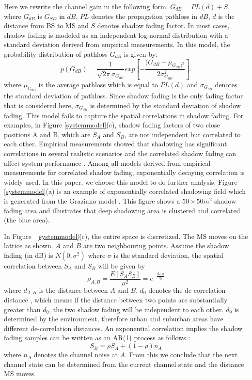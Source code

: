 \par Here we rewrite the channel gain in the following form: $G_{dB}=PL(d)+S$, where $G_{dB}$ is $G_{SD}$ in $dB$, $PL$ denotes the propagation pathloss in $dB$, $d$ is the distance from BS to MS and $S$ denotes shadow fading factor. In most cases, shadow fading is modeled as an independent log-normal distribution \cite{goldsmith2005wireless} with a standard deviation derived from empirical measurements. In this model, the probability distribution of pathloss $G_{dB}$ is given by:
\begin{equation}
p(G_{dB})=\frac{1}{\sqrt{2\pi}\sigma_{G_{dB}}}exp[-\frac{(G_{dB}-\mu_{G_{dB})^2}}{2\sigma_{G_{dB}}^2}].
\end{equation}
where $\mu_{G_{dB}}$ is the average pathloss which is equal to $PL(d)$ and $\sigma_{G_{dB}}$ denotes the standard deviation of pathloss. Since shadow fading is the only fading factor that is considered here, $\sigma_{G_{dB}}$ is determined by the standard deviation of shadow fading.
This model fails to capture the spatial correlations in shadow fading. For examples, in Figure \ref{systemmodel}(c), shadow fading factors of two close positions A and B, which are $S_{A}$ and $S_{B}$, are not independent but correlated to each other. Empirical measurements showed that shadowing has significant correlations in several realistic scenarios and the correlated shadow fading can affect system performance \cite{graziano1978propagation}. Among all models derived from empirical measurements for correlated shadow fading, exponentially decaying correlation \cite{gudmundson1991correlation} is widely used. In this paper, we choose this model to do further analysis. Figure \ref{systemmodel}(a) is an example of exponentially correlated shadowing field which is generated from the Graziano model \cite{graziano1978propagation}. This figure shows a $50\times50 m^{2}$ shadow fading area and illustrates that deep shadowing area is clustered and correlated (the blue area).
\par In Figure ~\ref{systemmodel}(c), the entire space is discretized. The MS moves on the lattice as shown. $A$ and $B$ are two neighbouring points. Assume the shadow fading (in dB) is $N(0,\sigma^{2})$ where $\sigma$ is the standard deviation, the spatial correlation between $S_{A}$ and $S_{B}$ will be given by
\begin{equation}
\rho_{A,B}=\frac{E[S_{A}S_{B}]}{\sigma^{2}}=e^{{-\frac{d_{A,B}}{d_{0}}}}
\end{equation}
where $d_{A,B}$ is the distance between $A$ and $B$, $d_{0}$ denotes the de-correlation distance \cite{bertoni1999radio}, which means if the distance between two points are substantially greater than $d_{0}$, the two shadow fading will be independent to each other. $d_{0}$ is determined by the environment, therefore urban and suburban areas have different de-correlation distances. An exponential correlation implies the shadow fading samples can be written as an AR(1) process as follows \cite{wei1994time}:
\begin{equation}
S_{B} = \rho S_{A} + (1-\rho)n_{A}
\label{e3}
\end{equation}
where $n_{A}$ denotes the channel noise at $A$. From this we conclude that the next channel state can be determined from the current channel state and the distance MS moves.
